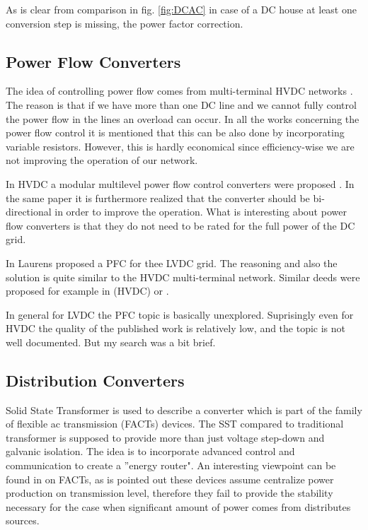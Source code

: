 \documentclass[]{scrartcl}
\begin{document}
As is clear from comparison in fig. \ref{fig:DCAC} in case of a DC house at least one conversion step is missing, the power factor correction. 

\subsection{Power Flow Converters}

The idea of controlling power flow comes from multi-terminal HVDC networks \cite{Hajian2012}. The reason is that if we have more than one DC line and we cannot fully control the power flow in the lines an overload can occur. In all the works concerning the power flow control it is mentioned that this can be also done by incorporating variable resistors. However, this is hardly economical since efficiency-wise we are not improving the operation of our network. 

In HVDC a modular multilevel power flow control converters were proposed \cite{Xu2014}. In the same paper it is furthermore realized that the converter should be bi-directional in order to improve the operation. What is interesting about power flow converters is that they do not need to be rated for the full power of the DC grid. 

In \cite{Mackay2015} Laurens proposed a PFC for thee LVDC grid. The reasoning and also the solution is quite similar to the HVDC multi-terminal network. Similar deeds were proposed for example in \cite{Mu2012}(HVDC) or \cite{Mohamed}. 

In general for LVDC the PFC topic is basically unexplored. Suprisingly even for HVDC the quality of the published work is relatively low, and the topic is not well documented. But my search was a bit brief.   

\subsection{Distribution Converters}

Solid State Transformer is used to describe a converter which is part of the family of flexible ac transmission (FACTs) devices. The SST compared to traditional transformer is supposed to provide more than just voltage step-down and galvanic isolation. The idea is to incorporate advanced control and communication to create a ''energy router"\cite{She2012}. An interesting viewpoint can be found in \cite{Doncker2014} on FACTs, as is pointed out these devices assume centralize power production on transmission level, therefore they fail to provide the stability necessary for the case when significant amount of power comes from distributes sources.
\end{document}
